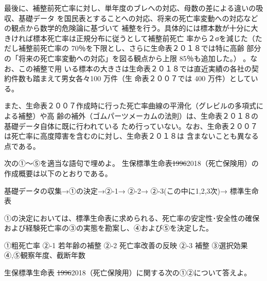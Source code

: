 \documentclass[report,gutter=10mm,fore-edge=10mm,uplatex,dvipdfmx]{jlreq}
\begin{document}
最後に、補整前死亡率に対し、単年度のブレへの対応、母数の差による違いの吸収、基礎データ
を国民表とすることへの対応、将来の死亡率変動への対応などの観点から数学的危険論に基づいて
補整を行う。具体的には標本数が十分に大きければ標本死亡率は正規分布に従うとして補整前死亡
率から２σを減じた（ただし補整前死亡率の 70％を下限とし、さらに生命表２０１８では特に高齢
部分の「将来の死亡率変動への対応」を図る観点から上限 85％も追加した。）
。なお、この補整で用
いる標本の大きさは生命表２０１８では直近実績の各社の契約件数も踏まえて男女各々100 万件（生
命表２００７では 400 万件）としている。

また、生命表２００７作成時に行った死亡率曲線の平滑化（グレビルの多項式による補整）や高
齢の補外（ゴムパーツメーカムの法則）は、生命表２０１８の基礎データ自体に既に行われている
ため行っていない。なお、生命表２００７は死亡率に高度障害を含むのに対し、生命表２０１８は
含まないことも異なる点である。


次の①～⑤を適当な語句で埋めよ。
生保標準生命表\sout{1996}2018（死亡保険用）の作成概要は以下のとおりである。 

\begin{center}
 基礎データの収集→①の決定→②-1→ ②-2→ ②-3(この中に1,2,3次)→ 標準生命表
\end{center}

①の決定においては、標準生命表に求められる、死亡率の安定性･安全性の確保および経験死亡率の③の実態を勘案し、④および⑤を決定した。

①粗死亡率 ②-1 若年齢の補整  ②-2 死亡率改善の反映 ②-3 補整 ③選択効果④,⑤観察年度、截断年数


生保標準生命表 \sout{1996}2018（死亡保険用）に関する次の①②について答えよ。
\end{document}
